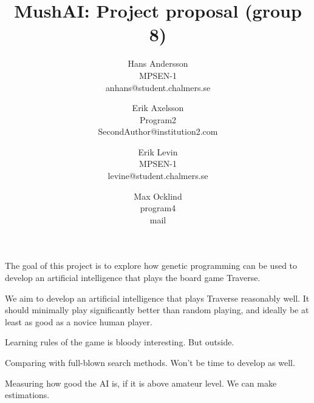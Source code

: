 \documentclass[times, 10pt,twocolumn]{article}
\begin{document}
\title{MushAI: Project proposal (group 8)}

\author{Hans Andersson\\
MPSEN-1\\anhans@student.chalmers.se\\
\and
Erik Axelsson\\
Program2\\
SecondAuthor@institution2.com\\
\and
Erik Levin\\
MPSEN-1\\
levine@student.chalmers.se
\and
Max Ocklind\\
program4\\
mail
}

\maketitle
\thispagestyle{empty}



The goal of this project is to explore how genetic programming can be used to develop an artificial intelligence that plays the board game Traverse.



We aim to develop an artificial intelligence that plays Traverse reasonably well. It should minimally play  significantly better than random playing, and ideally be at least as good as a novice human player.


Learning rules of the game is bloody interesting. But outside.

Comparing with full-blown search methods. Won't be time to develop as well.

Measuring how good the AI is, if it is above amateur level. We can make estimations.

\end{document}
